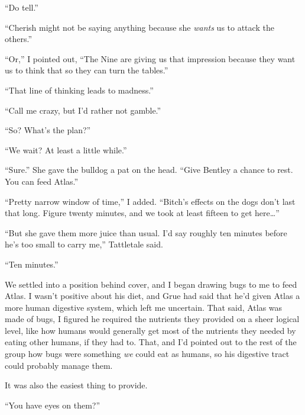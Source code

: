``Do tell.''



``Cherish might not be saying anything because she \emph{wants} us to attack the others.''



``Or,'' I pointed out, ``The Nine are giving us that impression because they want us to think that so they can turn the tables.''



``That line of thinking leads to madness.''



``Call me crazy, but I'd rather not gamble.''



``So?  What's the plan?''



``We wait?  At least a little while.''



``Sure.''  She gave the bulldog a pat on the head.  ``Give Bentley a chance to rest.  You can feed Atlas.''



``Pretty narrow window of time,'' I added.  ``Bitch's effects on the dogs don't last that long.  Figure twenty minutes, and we took at least fifteen to get here\ldots''



``But she gave them more juice than usual.  I'd say roughly ten minutes before he's too small to carry me,'' Tattletale said.



``Ten minutes.''



We settled into a position behind cover, and I began drawing bugs to me to feed Atlas.  I wasn't positive about his diet, and Grue had said that he'd given Atlas a more human digestive system, which left me uncertain.  That said, Atlas was made of bugs, I figured he required the nutrients they provided on a sheer logical level, like how humans would generally get most of the nutrients they needed by eating other humans, if they had to.  That, and I'd pointed out to the rest of the group how bugs were something \emph{we }could eat as humans, so his digestive tract could probably manage them.



It was also the easiest thing to provide.



``You have eyes on them?''



